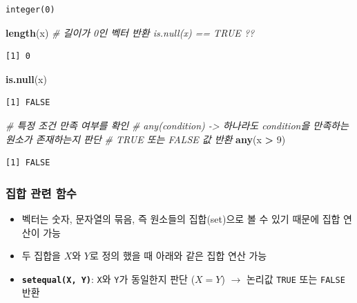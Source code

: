 \documentclass[
  11pt,
]{krantz}
\newenvironment{Shaded}{\begin{snugshade}}{\end{snugshade}}
\newcommand{\CommentTok}[1]{\textcolor[rgb]{0.37,0.37,0.37}{\textit{#1}}}
\newcommand{\DecValTok}[1]{\textcolor[rgb]{0.06,0.06,0.06}{#1}}
\newcommand{\KeywordTok}[1]{\textcolor[rgb]{0.27,0.27,0.27}{\textbf{#1}}}
\newcommand{\NormalTok}[1]{#1}
\newcommand{\OperatorTok}[1]{\textcolor[rgb]{0.43,0.43,0.43}{\textbf{#1}}}
\newcommand{\StringTok}[1]{\textcolor[rgb]{0.5,0.5,0.5}{#1}}
\providecommand{\tightlist}{%
  \setlength{\itemsep}{0pt}\setlength{\parskip}{0pt}}
\begin{document}
\begin{verbatim}
integer(0)
\end{verbatim}

\begin{Shaded}
\begin{Highlighting}[]
\KeywordTok{length}\NormalTok{(x) }\CommentTok{# 길이가 0인 벡터 반환 is.null(x) == TRUE ??}
\end{Highlighting}
\end{Shaded}

\begin{verbatim}
[1] 0
\end{verbatim}

\begin{Shaded}
\begin{Highlighting}[]
\KeywordTok{is.null}\NormalTok{(x)}
\end{Highlighting}
\end{Shaded}

\begin{verbatim}
[1] FALSE
\end{verbatim}

\begin{Shaded}
\begin{Highlighting}[]
\CommentTok{# 특정 조건 만족 여부를 확인 }
\CommentTok{# any(condition) -> 하나라도 condition을 만족하는 원소가 존재하는지 판단}
\CommentTok{# TRUE 또는 FALSE 값 반환}
\KeywordTok{any}\NormalTok{(x }\OperatorTok{>}\StringTok{ }\DecValTok{9}\NormalTok{)}
\end{Highlighting}
\end{Shaded}

\begin{verbatim}
[1] FALSE
\end{verbatim}

\normalsize

\hypertarget{set-function}{%
\subsubsection*{\texorpdfstring{\textbf{집합 관련 함수}}{집합 관련 함수}}\label{set-function}}


\begin{itemize}
\tightlist
\item
  벡터는 숫자, 문자열의 묶음, 즉 원소들의 집합(set)으로 볼 수 있기 때문에 집합 연산이 가능
\item
  두 집합을 \(X\)와 \(Y\)로 정의 했을 때 아래와 같은 집합 연산 가능
\item
  \textbf{\texttt{setequal(X,\ Y)}}: \texttt{X}와 \texttt{Y}가 동일한지 판단 (\(X = Y\)) \(\rightarrow\) 논리값 \texttt{TRUE} 또는 \texttt{FALSE} 반환
\end{itemize}
\end{document}
